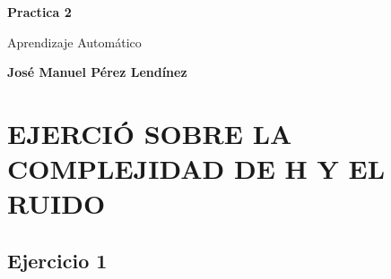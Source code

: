 \documentclass[titlepage]{article}
\begin{document}
	\begin{titlepage}
		\begin{center}
			\vspace*{1cm}
			\date{} %
			\Huge
			\textbf{Practica 2}
			
			\vspace{0.5cm}
			\LARGE
			Aprendizaje Automático
			
			\vspace{1.5cm}
			
			\textbf{José Manuel Pérez Lendínez}
			

			
		\end{center}
	\newpage
	\tableofcontents
	\newpage
	\end{titlepage}

	\section{EJERCIÓ SOBRE LA COMPLEJIDAD DE H Y EL RUIDO}
	
	\subsection{Ejercicio 1}
	
\end{document}
